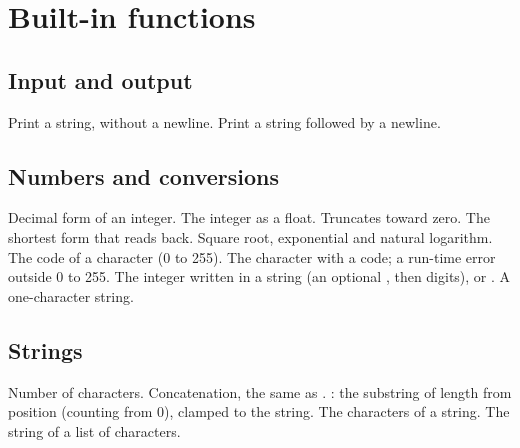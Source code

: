 \section{Built-in functions}
\label{sec:builtins}

\subsection{Input and output}
\begin{siglist}
 Print a string, without a newline.
 Print a string followed by a newline.
\end{siglist}

\subsection{Numbers and conversions}
\begin{siglist}
 Decimal form of an integer.
 The integer as a float.
 Truncates toward zero.
 The shortest form that reads back.
 Square root, exponential and natural logarithm.
 The code of a character (0 to 255).
 The character with a code; a run-time error outside 0 to 255.
 The integer written in a string (an optional \tc{-}, then digits), or .
 A one-character string.
\end{siglist}

\subsection{Strings}
\begin{siglist}
 Number of characters.
 Concatenation, the same as \tc{^}.
 :
the substring of length  from position  (counting from 0),
clamped to the string.
 The characters
of a string.
 The string of a list of characters.
\end{siglist}

